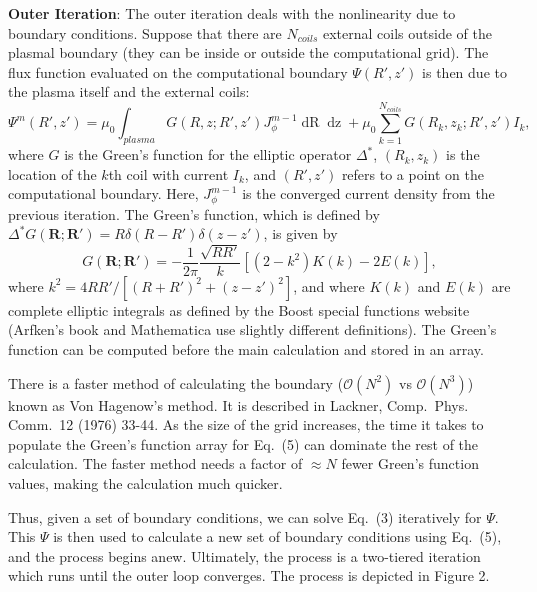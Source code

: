 \documentclass[paper=letter, fontsize=11pt]{scrartcl} %
\begin{document}

\textbf{Outer Iteration}: The outer iteration deals with the nonlinearity due to boundary conditions.  Suppose that there are $N_{coils}$ external coils outside of the plasmal boundary (they can be inside or outside the computational grid).  The flux function evaluated on the computational boundary $\Psi(R',z')$ is then due to the plasma itself and the external coils:
\begin{equation}
\Psi^m (R',z') = \mu_0 \int_{plasma} G(R,z; R',z') J_{\phi}^{m-1} \mathop{dR} \mathop{dz} + \mu_0 \sum_{k=1}^{N_{coils}} G(R_k,z_k; R',z') I_k,
\end{equation}
where $G$ is the Green's function for the elliptic operator $\Delta^{*}$, $(R_k,z_k)$ is the location of the $k$th coil with current $I_k$, and $(R',z')$ refers to a point on the computational boundary. Here, $J_{\phi}^{m-1}$ is the converged current density from the previous  iteration.  The Green's function, which is defined by $\Delta^{*}G(\mathbf{R};\mathbf{R'}) = R \delta(R-R')\delta(z-z')$, is given by
\begin{equation}
G(\mathbf{R};\mathbf{R'}) = -\frac{1}{2\pi} \frac{\sqrt{RR'}}{k} [(2-k^2) K(k) - 2 E(k)], 
\end{equation} 
where $k^2 = 4RR'/[(R+R')^2+(z-z')^2]$, and where $K(k)$ and $E(k)$ are complete elliptic integrals as defined by the Boost special functions website (Arfken's book and Mathematica use slightly different definitions). The Green's function can be computed before the main calculation and stored in an array.


There is a faster method of calculating the boundary ($\mathcal{O}(N^2)$ vs $\mathcal{O}(N^3)$) known as Von Hagenow's method. It is described in Lackner, Comp.~Phys. Comm.~12 (1976) 33-44.  As the size of the grid increases, the time it takes to populate the Green's function array for Eq.~(5) can dominate the rest of the calculation.  The faster method needs a factor of $\approx N$ fewer Green's function values, making the calculation much quicker.    

Thus, given a set of boundary conditions, we can solve Eq.~(3) iteratively for $\Psi$.  This $\Psi$ is then used to calculate a new set of boundary conditions using Eq.~(5), and the process begins anew.  Ultimately, the process is a two-tiered iteration which runs until the outer loop converges.  The process is depicted in Figure 2.
\end{document}
